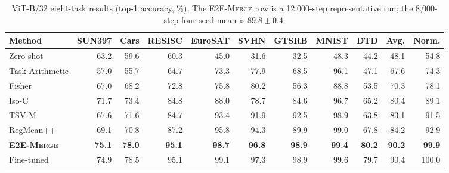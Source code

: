 \documentclass[letterpaper]{article} %
\newcommand{\method}{\textup{\textsc{E2E-Merge}}\xspace}
\theoremstyle{plain}
\theoremstyle{definition}
\begin{document}
\begin{table}[tb]
\centering
{\small
\begin{tabular*}{\textwidth}{@{\extracolsep{\fill}}lrrrrrrrrrr}
\toprule
Method & SUN397 & Cars & RESISC & EuroSAT & SVHN & GTSRB & MNIST & DTD & Avg. & Norm. \\
\midrule
Zero-shot & 63.2 & 59.6 & 60.3 & 45.0 & 31.6 & 32.5 & 48.3 & 44.2 & 48.1 & 54.8 \\
Task Arithmetic & 57.0 & 55.7 & 64.7 & 73.3 & 77.9 & 68.5 & 96.1 & 47.1 & 67.6 & 74.3 \\
Fisher & 67.0 & 68.2 & 72.8 & 75.8 & 80.2 & 56.3 & 88.8 & 53.5 & 70.3 & 78.1 \\
Iso-C & 71.7 & 73.4 & 84.8 & 88.0 & 78.7 & 84.6 & 96.7 & 65.2 & 80.4 & 89.1 \\
TSV-M & 67.6 & 71.6 & 84.7 & 93.4 & 91.9 & 92.5 & 98.9 & 63.8 & 83.1 & 91.5 \\
RegMean++ & 69.1 & 70.8 & 87.2 & 95.8 & 94.3 & 89.9 & 99.0 & 67.8 & 84.2 & 92.9 \\
\textbf{\method} & \textbf{75.1} & \textbf{78.0} & \textbf{95.1} & \textbf{98.7} & \textbf{96.8} & \textbf{98.9} & \textbf{99.4} & \textbf{80.2} & \textbf{90.2} & \textbf{99.9} \\
\midrule
Fine-tuned & 74.9 & 78.5 & 95.1 & 99.1 & 97.3 & 98.9 & 99.6 & 79.7 & 90.4 & 100.0 \\
\bottomrule
\end{tabular*}
}
\caption{ViT-B/32 eight-task results (top-1 accuracy, \%). The \method row is a
12,000-step representative run; the 8,000-step four-seed mean is $89.8\pm0.4$.}
\label{tab:b32-main}
\end{table}
\end{document}
